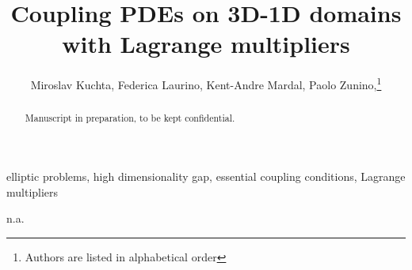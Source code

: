 \documentclass[r]{siamart171218}
\title{Coupling PDEs on 3D-1D domains with Lagrange multipliers}
\author{Miroslav Kuchta, Federica Laurino, Kent-Andre Mardal, Paolo Zunino,\thanks{Authors are listed in alphabetical order}}
\begin{document}
\linenumbers

\maketitle

\begin{abstract}
Manuscript in preparation, to be kept confidential.
\end{abstract}

\begin{keywords}
elliptic problems, high dimensionality gap, essential coupling conditions, Lagrange multipliers
\end{keywords}

\begin{AMS}
n.a.
\end{AMS}

 

\def\ud{u_{\odot}}
\def\vd{v_{\odot}}
\def\ld{\lambda_{\odot}}
\def\udh{u_{\odot h}}
\def\udfh{u_{\odot \fkh}}
\def\vdh{v_{\odot h}}
\def\vdfh{v_{\odot \fkh}}
\def\ldh{\lambda_{\odot h}}
\def\md{\mu_{\odot}}
\def\mdh{\mu_{\odot h}}
\def\lld{l_{\odot}}
\def\uf{u_{\ominus}}
\def\up{u_{\oplus}}
\def\eps{\epsilon}
\def\nn{\boldsymbol n}
\def\rr{\boldsymbol r}
\def\RR{\boldsymbol R}
\def\kk{\boldsymbol k}
\def\ss{\boldsymbol s}
\def\uu{\boldsymbol u}
\def\vv{\boldsymbol v}
\def\xx{\boldsymbol x}
\def\bu{\overline{u}}
\def\bv{\overline{v}}
\def\tu{\widetilde{u}}
\def\tv{\widetilde{v}}
\def\TT{\boldsymbol T}
\def\NN{\boldsymbol N}
\def\BB{\boldsymbol B}
\def\ttu{\widetilde{\widetilde{u}}}
\def\ttv{\widetilde{\widetilde{v}}}
\def\cv{\check{v}}
\def\mesh{{\cal T}^h}
\def\ball{{\cal B}}
\def\R{\mathbb{R}}
\def\D{\mathcal{D}}
\def\DD{\partial\mathcal{D}}
\def\trace{{\mathcal{T}_\Gamma}}
\def\mtrace{{\overline{\mathcal{T}}_\Lambda}}
\def\ext{\mathcal{E}_\Gamma}
\def\ide{\mathcal{I}}
\def\ii{\hat{\imath}}
\def\fkh{\mathfrak{h}}
\newcommand{\avrd}[1]{\overline{\overline{#1}}}
\newcommand{\avrc}[1]{\overline{#1}}
\newcommand{\refe}[1]{{#1}_{\mathrm{ref}}}
\newcommand{\norm}[1]{\lVert{#1}\rVert}

\newcommand{\vertiii}[1]{{\left\vert\kern-0.25ex\left\vert\kern-0.25ex\left\vert #1 
    \right\vert\kern-0.25ex\right\vert\kern-0.25ex\right\vert}}

\newtheorem{thm}{Theorem}[section]
\newtheorem{prop}{Property}[section]
\theoremstyle{remark}
\newtheorem{remark}{Remark}[section]
 
\end{document}
